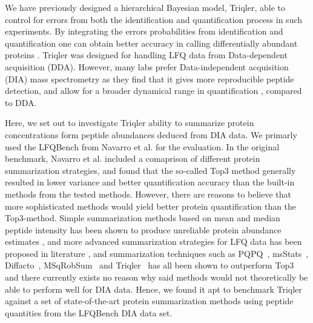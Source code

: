 \documentclass[10pt,letterpaper]{article}
\begin{document}
We have previously designed a hierarchical Bayesian model, Triqler, able to control for errors from both the identification and quantification process in such experiments\cite{The2018Integrated}. By integrating the errors probabilities from identification and quantification one can obtain better accuracy in calling differentially abundant proteins \cite{The2018Integrated}.   Triqler was designed for handling LFQ data from Data-dependent acquisition (DDA). However, many labs prefer Data-independent acquisition (DIA) mass spectrometry \cite{venable2004automated} as they find that it gives more reproducible peptide detection, and allow for a broader dynamical range in quantification \cite{bern2010deconvolution,zhang2020DIA}, compared to DDA. 

Here, we set out to investigate Triqler ability to summarize protein concentrations form peptide abundances deduced from DIA data. We primarly used the LFQBench from Navarro et al. \cite{navarro2016multicenter} for the evaluation. In the original benchmark, Navarro et al. included a comaprison of different protein summarization strategies, and found that the so-called Top3 method generally resulted in lower variance and better quantification accuracy than the built-in methods from the tested methods\cite{navarro2016multicenter}. However, there are reasons to believe that more sophisticated methods would yield better protein quantification than the Top3-method. Simple summarization methods based on mean and median peptide intensity has been shown to produce unreliable protein abundance estimates \cite{goeminne2015summarization}, and more advanced summarization strategies for LFQ data has been proposed in literature \cite{silva2006absolute,cox2014accurate}, and summarization techniques such as PQPQ~\cite{forshed2011enhanced}, msStats~\cite{choi2014msstats}, Diffacto~\cite{zhang2017covariation}, MSqRobSum~\cite{sticker2020robust} and Triqler~\cite{The2018Integrated} has all been shown to outperform Top3 and there currently exists no reason why said methods would not theoretically be able to perform well for DIA data. Hence, we found it apt to benchmark Triqler against a set of state-of-the-art protein summarization methods using peptide quantities from the LFQBench DIA data set.


 
\end{document}
